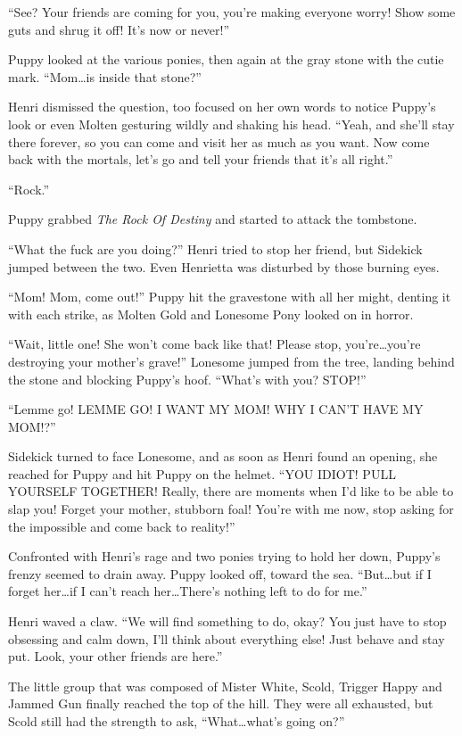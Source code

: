 ``See? Your friends are coming for you, you're making everyone worry! Show some guts and shrug it off! It's now or never!''

Puppy looked at the various ponies, then again at the gray stone with the cutie mark. ``Mom\dots is inside that stone?''

Henri dismissed the question, too focused on her own words to notice Puppy's look or even Molten gesturing wildly and shaking his head. ``Yeah, and she'll stay there forever, so you can come and visit her as much as you want. Now come back with the mortals, let's go and tell your friends that it's all right.''

``Rock.''

Puppy grabbed \emph{The Rock Of Destiny} and started to attack the tombstone.

``What the fuck are you doing?'' Henri tried to stop her friend, but Sidekick jumped between the two. Even Henrietta was disturbed by those burning eyes.

``Mom! Mom, come out!'' Puppy hit the gravestone with all her might, denting it with each strike, as Molten Gold and Lonesome Pony looked on in horror.

``Wait, little one! She won't come back like that! Please stop, you're\dots you're destroying your mother's grave!'' Lonesome jumped from the tree, landing behind the stone and blocking Puppy's hoof. ``What's with you? STOP!''

``Lemme go! LEMME GO! I WANT MY MOM! WHY I CAN'T HAVE MY MOM!?''

Sidekick turned to face Lonesome, and as soon as Henri found an opening, she reached for Puppy and hit Puppy on the helmet. ``YOU IDIOT! PULL YOURSELF TOGETHER! Really, there are moments when I'd like to be able to slap you! Forget your mother, stubborn foal! You're with me now, stop asking for the impossible and come back to reality!''

Confronted with Henri's rage and two ponies trying to hold her down, Puppy's frenzy seemed to drain away. Puppy looked off, toward the sea. ``But\dots but if I forget her\dots if I can't reach her\dots There's nothing left to do for me.''

Henri waved a claw. ``We will find something to do, okay? You just have to stop obsessing and calm down, I'll think about everything else! Just behave and stay put. Look, your other friends are here.''

The little group that was composed of Mister White, Scold, Trigger Happy and Jammed Gun finally reached the top of the hill. They were all exhausted, but Scold still had the strength to ask, ``What\dots what's going on?''

